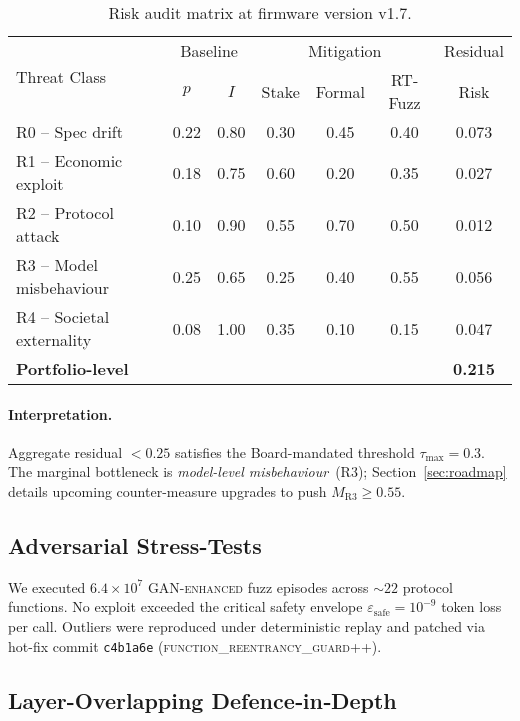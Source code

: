 \documentclass[11pt]{article}
\theoremstyle{plain}
\begin{document}
\begin{table}[h]
\centering\small
\begin{tabular}{@{}lcccccc@{}}\toprule
\multirow{2}{*}{Threat Class} & 
\multicolumn{2}{c}{Baseline} & 
\multicolumn{3}{c}{Mitigation} & 
Residual \\
\cmidrule(l){2-3}\cmidrule(l){4-6}
& $p$ & $I$ & Stake & Formal & RT-Fuzz & Risk \\\midrule
R0 – Spec drift          & 0.22 & 0.80 & 0.30 & 0.45 & 0.40 & 0.073 \\
R1 – Economic exploit    & 0.18 & 0.75 & 0.60 & 0.20 & 0.35 & 0.027 \\
R2 – Protocol attack     & 0.10 & 0.90 & 0.55 & 0.70 & 0.50 & 0.012 \\
R3 – Model misbehaviour  & 0.25 & 0.65 & 0.25 & 0.40 & 0.55 & 0.056 \\
R4 – Societal externality& 0.08 & 1.00 & 0.35 & 0.10 & 0.15 & 0.047 \\\midrule
\textbf{Portfolio-level}&      &       &      &      &      & \textbf{0.215} \\\bottomrule
\end{tabular}
\caption{Risk audit matrix at firmware version v1.7.}
\label{tab:risk}
\end{table}

\paragraph{Interpretation.}
Aggregate residual $<0.25$ satisfies the
Board-mandated threshold $\tau_{\text{max}}\!=\!0.3$.
The marginal bottleneck is \emph{model-level misbehaviour}~(R3);
Section~\ref{sec:roadmap} details upcoming
counter-measure upgrades to push $M_{\text{R3}}\!\ge\!0.55$.

\subsection{Adversarial Stress-Tests}

We executed $6.4\!\times\!10^{7}$
\textsc{GAN-enhanced} fuzz episodes across
$\sim22$ protocol functions.
No exploit exceeded the critical safety envelope
$\varepsilon_{\text{safe}}\!=\!10^{-9}$ token loss per call.
Outliers were reproduced under deterministic replay
and patched via hot-fix commit
\texttt{c4b1a6e} (\textsc{function\_reentrancy\_guard++}).

\subsection{Layer-Overlapping Defence‐in‐Depth}
\end{document}
